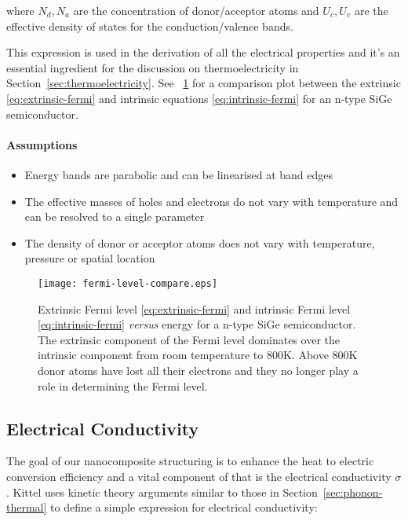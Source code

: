 \documentclass[12pt]{article}
\newcommand{\figref}[2][\figurename~]{#1\ref{#2}}
\newcommand{\secref}[2][Section~]{#1\ref{#2}}
\begin{document}
where $N_d, N_a$ are the concentration of donor/acceptor atoms and $U_c, U_v$ are the effective density of states for the conduction/valence bands.

This expression is used in the derivation of all the electrical properties and it's an essential ingredient for the discussion on thermoelectricity in \secref{sec:thermoelectricity}. See \figref{fig:fermi-level-compare} for a comparison plot between the extrinsic \eqref{eq:extrinsic-fermi} and intrinsic equations \eqref{eq:intrinsic-fermi} for an n-type SiGe semiconductor.

\paragraph{Assumptions}
\begin{itemize}
  \item Energy bands are parabolic and can be linearised at band edges
  \item The effective masses of holes and electrons do not vary with temperature and can be resolved to a single parameter
  \item The density of donor or acceptor atoms does not vary with temperature, pressure or spatial location
\end{itemize}

\begin{figure}
	\centering
	\texttt{[image: fermi-level-compare.eps]}
	\caption{Extrinsic Fermi level \eqref{eq:extrinsic-fermi} and intrinsic Fermi level \eqref{eq:intrinsic-fermi} \emph{versus} energy for a n-type SiGe semiconductor. The extrinsic component of the Fermi level dominates over the intrinsic component from room temperature to 800K. Above 800K donor atoms have lost all their electrons and they no longer play a role in determining the Fermi level.}
	\label{fig:fermi-level-compare}
\end{figure}

\pagebreak

\subsection{Electrical Conductivity}
\label{sec:electrical-transport}
The goal of our nanocomposite structuring is to enhance the heat to electric conversion efficiency and a vital component of that is the electrical conductivity $\sigma$. Kittel \cite{kittel} uses kinetic theory arguments similar to those in \secref{sec:phonon-thermal} to define a simple expression for electrical conductivity:
\end{document}
